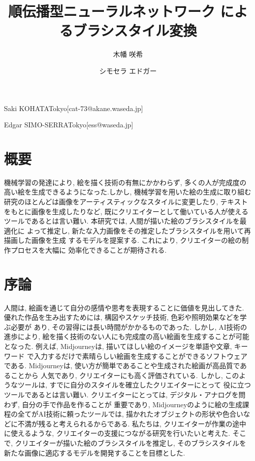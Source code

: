 \documentclass[MIRU,submit,uplatex]{miru2023j}
\begin{document}
\title{順伝播型ニューラルネットワーク によるブラシスタイル変換}


 \author{木幡 咲希}{Saki KOHATA}{Tokyo}[cat-73@akane.waseda.jp]
 \author{シモセラ エドガー}{Edgar SIMO-SERRA}{Tokyo}[ess@waseda.jp]

\maketitle

\section*{概要}
機械学習の発達により, 絵を描く技術の有無にかかわらず, 多くの人が完成度の
高い絵を生成できるようになった.しかし, 機械学習を用いた絵の生成に取り組む
研究のほとんどは画像をアーティスティックなスタイルに変更したり, テキスト
をもとに画像を生成したりなど, 既にクリエイターとして働いている人が使える
ツールであるとは言い難い. 本研究では, 人間が描いた絵のブラシスタイルを最適化に
よって推定し, 新たな入力画像をその推定したブラシスタイルを用いて再描画した画像を生成
するモデルを提案する. これにより, クリエイターの絵の制作プロセスを大幅に
効率化できることが期待される.
 

\section{序論}
人間は, 絵画を通じて自分の感情や思考を表現することに価値を見出してきた.
優れた作品を生み出すためには, 構図やスケッチ技術, 色彩や照明効果などを学ぶ必要が
あり, その習得には長い時間がかかるものであった. しかし, AI技術の進歩により, 
絵を描く技術のない人にも完成度の高い絵画を生成することが可能となった.
例えば, Midjourney\cite{Midjourney}は, 描いてほしい絵のイメージを単語や文章, キーワード
で入力するだけで素晴らしい絵画を生成することができるソフトウェアである. 
Midjourneyは, 使い方が簡単であることや生成された絵画が高品質であることから
人気であり, クリエイターにも高く評価されている.
しかし, このようなツールは, すでに自分のスタイルを確立したクリエイターにとって
役に立つツールであるとは言い難い. 
クリエイターにとっては, デジタル・アナログを問わず, 自分の手で作品を作ることが
重要であり, Midjourneyのように絵の生成課程の全てがAI技術に頼ったツールでは, 
描かれたオブジェクトの形状や色合いなどに不満が残ると考えられるからである.
私たちは, クリエイターが作業の途中に使えるような, 
クリエイターの支援につながる研究を行いたいと考えた.
そこで, クリエイターが描いた絵のブラシスタイルを推定し, そのブラシスタイルを
新たな画像に適応するモデルを開発することを目標とした.
\end{document}
